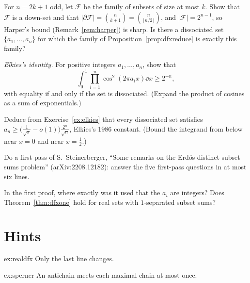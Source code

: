 \begin{exercise}[$\star\star$]\label{ex:ballsharp}
For $n=2k+1$ odd, let $\mathcal F$ be the family of subsets of size at most $k$. Show that $\mathcal F$ is a down-set and that $|\partial\mathcal F|=\binom n{k+1}=\binom n{\lfloor n/2\rfloor}$, and $|\mathcal F|=2^{n-1}$, so Harper's bound (Remark~\ref{rem:harper}) is sharp.
Is there a dissociated set $\{a_1,\dots,a_n\}$ for which the family of Proposition~\ref{prop:dfxreduce} is exactly this family?
\end{exercise}

\begin{exercise}[$\star\star$]\label{ex:elkies}
\emph{Elkies's identity.} For positive integers $a_1,\dots,a_n$, show that
\[
\int_0^1\prod_{i=1}^n\cos^2(2\pi a_ix)\dd x\ge2^{-n},
\]
with equality if and only if the set is dissociated. (Expand the product of cosines as a sum of exponentials.)
\end{exercise}

\begin{exercise}[$\star\star\star$]\label{ex:elkiesbound}
Deduce from Exercise~\ref{ex:elkies} that every dissociated set satisfies $a_n\ge\bigl(\frac1{\sqrt\pi}-o(1)\bigr)\frac{2^n}{\sqrt n}$, Elkies's 1986 constant. (Bound the integrand from below near
$x=0$ and near $x=\frac12$.)
\end{exercise}

\begin{exercise}[$\star\star$]\label{ex:firstpass}
Do a first pass of S.~Steinerberger, ``Some remarks on the Erd\H os distinct subset sums problem'' (arXiv:2208.12182): answer the five first-pass questions
in at most six lines.
\end{exercise}

\begin{exercise}[$\star\star$]\label{ex:gap}
In the first proof, where exactly was it used that the $a_i$ are integers? Does Theorem~\ref{thm:dfxone} hold for real sets with $1$-separated subset sums?
\end{exercise}

\section{Hints}

\begin{hint}{ex:realdfx}
Only the last line changes.
\end{hint}

\begin{hint}{ex:sperner}
An antichain meets each maximal chain at most once.
\end{hint}

